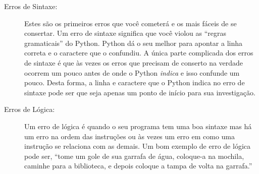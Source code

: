 \begin{description}
%

\item[Erros de Sintaxe:] Estes são os primeiros erros que você cometerá e os mais
fáceis de se consertar. Um erro de sintaxe significa que você violou as ``regras gramaticais''
do Python. Python dá o seu melhor para apontar a linha correta e o caractere que o
confundiu. A única parte complicada dos erros de sintaxe é que às vezes os erros
que precisam de conserto na verdade ocorrem um pouco antes de onde o Python {\em indica}
e isso confunde um pouco. Desta forma, a linha e  caractere que o Python indica
no erro de sintaxe pode ser que seja apenas um ponto de início para sua
investigação.
%

\item[Erros de Lógica:] Um erro de lógica é quando o seu programa tem uma boa sintaxe mas há
um erro na ordem das instruções ou às vezes um erro em como uma instrução se relaciona com
as demais. Um bom exemplo de erro de lógica pode ser, ``tome um gole de sua garrafa de água, coloque-a
na mochila, caminhe para a biblioteca, e depois coloque a tampa de volta na garrafa.''
%


\end{description}
